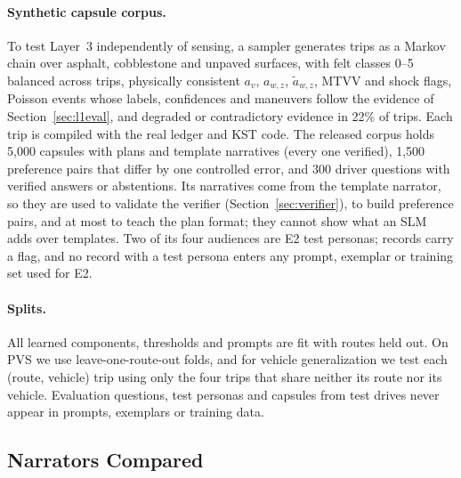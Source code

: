 \paragraph{Synthetic capsule corpus.}
To test Layer~3 independently of sensing, a sampler generates trips as a Markov chain over asphalt, cobblestone and unpaved surfaces, with felt classes 0--5 balanced across trips, physically consistent $a_v$, $a_{w,z}$, $\tilde a_{w,z}$, MTVV and shock flags, Poisson events whose labels, confidences and maneuvers follow the evidence of Section~\ref{sec:l1eval}, and degraded or contradictory evidence in 22\% of trips.
Each trip is compiled with the real ledger and KST code.
The released corpus holds 5{,}000 capsules with plans and template narratives (every one verified), 1{,}500 preference pairs that differ by one controlled error, and 300 driver questions with verified answers or abstentions.
Its narratives come from the template narrator, so they are used to validate the verifier (Section~\ref{sec:verifier}), to build preference pairs, and at most to teach the plan format; they cannot show what an SLM adds over templates.
Two of its four audiences are E2 test personas; records carry a flag, and no record with a test persona enters any prompt, exemplar or training set used for E2.

\paragraph{Splits.}
All learned components, thresholds and prompts are fit with routes held out.
On PVS we use leave-one-route-out folds, and for vehicle generalization we test each (route, vehicle) trip using only the four trips that share neither its route nor its vehicle.
Evaluation questions, test personas and capsules from test drives never appear in prompts, exemplars or training data.

\subsection{Narrators Compared}
\label{sec:conditions}

